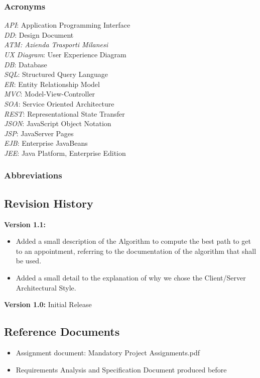 \documentclass[12pt]{article}
\begin{document}
\subsubsection{Acronyms}
\textit{API}: Application Programming Interface\\
\textit{DD}: Design Document\\
\textit{ATM: Azienda Trasporti Milanesi}\\
\textit{UX Diagram}: User Experience Diagram\\
\textit{DB}: Database\\
\textit{SQL}: Structured Query Language\\
\textit{ER}: Entity Relationship Model\\
\textit{MVC}: Model-View-Controller\\
\textit{SOA}: Service Oriented Architecture\\
\textit{REST}: Representational State Transfer\\
\textit{JSON}: JavaScript Object Notation\\
\textit{JSP}: JavaServer Pages\\
\textit{EJB}: Enterprise JavaBeans\\
\textit{JEE}: Java Platform, Enterprise Edition
\subsubsection{Abbreviations}


\subsection{Revision History}
\textbf{Version 1.1:} 
\begin{itemize}
    \item Added a small description of the Algorithm to compute the best path to get to an appointment, referring to the documentation of the algorithm that shall be used.
    \item Added a small detail to the explanation of why we chose the Client/Server Architectural Style.
\end{itemize}
\textbf{Version 1.0:} Initial Release

\subsection{Reference Documents}
\begin{itemize}
    \item Assignment document: Mandatory Project Assignments.pdf
    \item Requirements Analysis and Specification Document produced before
\end{itemize}
\end{document}
